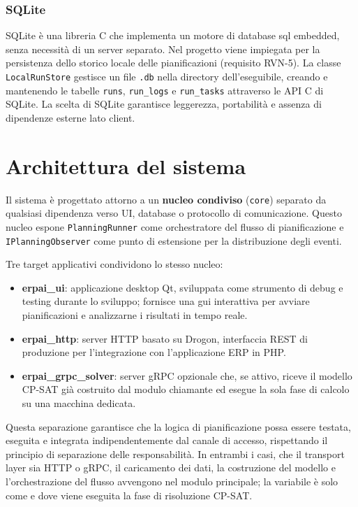 \subsubsection{SQLite}

SQLite è una libreria C che implementa un motore di database \gls{sql} embedded, senza necessità di un server separato. Nel progetto viene impiegata per la persistenza dello storico locale delle pianificazioni (requisito RVN-5). La classe \texttt{LocalRunStore} gestisce un file \texttt{.db} nella directory dell'eseguibile, creando e mantenendo le tabelle \texttt{runs}, \texttt{run\_logs} e \texttt{run\_tasks} attraverso le API C di SQLite. La scelta di SQLite garantisce leggerezza, portabilità e assenza di dipendenze esterne lato client.

\section{Architettura del sistema}
\label{sec:architettura}

Il sistema è progettato attorno a un \textbf{nucleo condiviso} (\texttt{core}) separato da qualsiasi dipendenza verso UI, database o protocollo di comunicazione. Questo nucleo espone \texttt{PlanningRunner} come orchestratore del flusso di pianificazione e \texttt{IPlanningObserver} come punto di estensione per la distribuzione degli eventi.

Tre target applicativi condividono lo stesso nucleo:

\begin{itemize}
    \item \textbf{erpai\_ui}: applicazione desktop Qt, sviluppata come strumento di debug e testing durante lo sviluppo; fornisce una \gls{gui} interattiva per avviare pianificazioni e analizzarne i risultati in tempo reale.
    \item \textbf{erpai\_http}: server HTTP basato su Drogon, interfaccia REST di produzione per l'integrazione con l'applicazione ERP in PHP.
    \item \textbf{erpai\_grpc\_solver}: server gRPC opzionale che, se attivo, riceve il modello CP-SAT già costruito dal modulo chiamante ed esegue la sola fase di calcolo su una macchina dedicata.
\end{itemize}

Questa separazione garantisce che la logica di pianificazione possa essere testata, eseguita e integrata indipendentemente dal canale di accesso, rispettando il principio di separazione delle responsabilità. In entrambi i casi, che il transport layer sia HTTP o gRPC, il caricamento dei dati, la costruzione del modello e l'orchestrazione del flusso avvengono nel modulo principale; la variabile è solo come e dove viene eseguita la fase di risoluzione CP-SAT.

